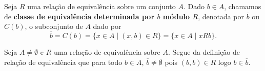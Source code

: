 \begin{definicao}
	Seja $R$ uma rela{\c c}{\~a}o de equival{\^e}ncia sobre um conjunto $A$. Dado $b \in A$, chamamos de \textbf{classe de equival{\^e}ncia determinada por $b$ m{\'o}dulo $R$}, denotada por $\overline{b}$ ou $C(b)$, o subconjunto de $A$ dado por
	\[
		\overline{b} = C(b) = \{x \in A \mid (x,b) \in R\} = \{x \in A \mid xRb\}.
	\]
\end{definicao}

\begin{observacao}
	Seja $A \ne \emptyset$ e $R$ uma rela\c{c}\~ao de equival\^encia sobre $A$. Segue da defini\c{c}\~ao de rela\c{c}\~ao de equival\^encia que para todo $b \in A$, $\overline{b} \ne \emptyset$ pois $(b,b) \in R$ logo $b \in \overline{b}$.
\end{observacao}

